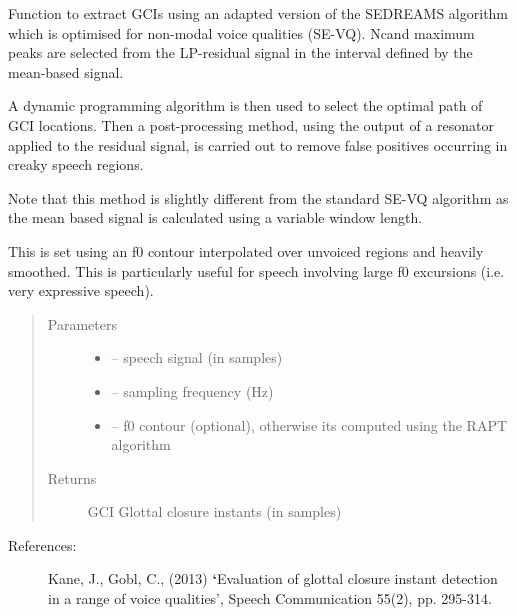 \documentclass[letterpaper,10pt,english]{sphinxmanual}
\begin{document}
\begin{fulllineitems}
\label{\detokenize{Glottal:glottal.SE_VQ_varF0}}
Function to extract GCIs using an adapted version of the SEDREAMS 
algorithm which is optimised for non-modal voice qualities (SE-VQ). Ncand maximum
peaks are selected from the LP-residual signal in the interval defined by
the mean-based signal.

A dynamic programming algorithm is then used to select the optimal path of GCI locations. 
Then a post-processing method, using the output of a resonator applied to the residual signal, is
carried out to remove false positives occurring in creaky speech regions.

Note that this method is slightly different from the standard SE-VQ
algorithm as the mean based signal is calculated using a variable window
length.

This is set using an f0 contour interpolated over unvoiced
regions and heavily smoothed. This is particularly useful for speech
involving large f0 excursions (i.e. very expressive speech).
\begin{quote}\begin{description}
\item[{Parameters}] \leavevmode\begin{itemize}
\item {} 
 -- speech signal (in samples)

\item {} 
 -- sampling frequency (Hz)

\item {} 
 -- f0 contour (optional), otherwise its computed  using the RAPT algorithm

\end{itemize}

\item[{Returns}] \leavevmode
GCI Glottal closure instants (in samples)

\end{description}\end{quote}
\begin{description}
\item[{References:}] \leavevmode
Kane, J., Gobl, C., (2013) {\color{red}\bfseries{}{}`}Evaluation of glottal closure instant 
detection in a range of voice qualities', Speech Communication
55(2), pp. 295-314.


\end{description}
\end{fulllineitems}
\end{document}
